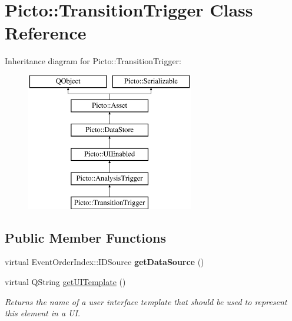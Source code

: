 \hypertarget{class_picto_1_1_transition_trigger}{\section{Picto\-:\-:Transition\-Trigger Class Reference}
\label{class_picto_1_1_transition_trigger}
}
Inheritance diagram for Picto\-:\-:Transition\-Trigger\-:\begin{figure}[H]
\begin{center}
\leavevmode
\includegraphics[height=6.000000cm]{class_picto_1_1_transition_trigger}
\end{center}
\end{figure}
\subsection*{Public Member Functions}
\begin{DoxyCompactItemize}
\item 
\hypertarget{class_picto_1_1_transition_trigger_a7e6c0d5217590f04ffd2cc83f47b3eb5}{virtual Event\-Order\-Index\-::\-I\-D\-Source {\bfseries get\-Data\-Source} ()}\label{class_picto_1_1_transition_trigger_a7e6c0d5217590f04ffd2cc83f47b3eb5}

\item 
\hypertarget{class_picto_1_1_transition_trigger_aa7bae24dc93c474373e6a9a89e02f667}{virtual Q\-String \hyperlink{class_picto_1_1_transition_trigger_aa7bae24dc93c474373e6a9a89e02f667}{get\-U\-I\-Template} ()}\label{class_picto_1_1_transition_trigger_aa7bae24dc93c474373e6a9a89e02f667}

\begin{DoxyCompactList}\small\item\em Returns the name of a user interface template that should be used to represent this element in a U\-I. \end{DoxyCompactList}\end{DoxyCompactItemize}
